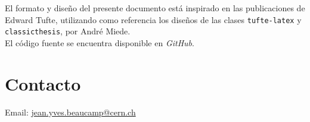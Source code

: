 El formato y diseño del presente documento está inspirado en las publicaciones de Edward Tufte, utilizando como referencia los diseños de las clases \texttt{tufte-latex} y \texttt{classicthesis}, por André Miede.\\

El código fuente se encuentra disponible en \emph{GitHub}.

\section*{\normalsize Contacto}

Email: {\small \href{mailto:jean.yves.beaucamp@cern.ch}{jean.yves.beaucamp@cern.ch}}

\clearpage{}

\cleardoublepage{}